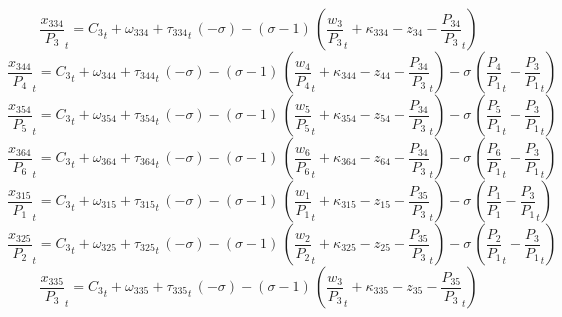 \begin{dmath}
{{\frac{x_{334}}{P_{3}}}}_{t}={{C_{3}}}_{t}+{{\omega_{334}}}+{{\tau_{334}}}_{t}\, \left(-{{\sigma}}\right)-\left({{\sigma}}-1\right)\, \left({{\frac{w_{3}}{P_{3}}}}_{t}+{{\kappa_{334}}}-{{z_{34}}}-{{\frac{P_{34}}{P_{3}}}}_{t}\right)
\end{dmath}
\begin{dmath}
{{\frac{x_{344}}{P_{4}}}}_{t}={{C_{3}}}_{t}+{{\omega_{344}}}+{{\tau_{344}}}_{t}\, \left(-{{\sigma}}\right)-\left({{\sigma}}-1\right)\, \left({{\frac{w_{4}}{P_{4}}}}_{t}+{{\kappa_{344}}}-{{z_{44}}}-{{\frac{P_{34}}{P_{3}}}}_{t}\right)-{{\sigma}}\, \left({{\frac{P_{4}}{P_{1}}}}_{t}-{{\frac{P_{3}}{P_{1}}}}_{t}\right)
\end{dmath}
\begin{dmath}
{{\frac{x_{354}}{P_{5}}}}_{t}={{C_{3}}}_{t}+{{\omega_{354}}}+{{\tau_{354}}}_{t}\, \left(-{{\sigma}}\right)-\left({{\sigma}}-1\right)\, \left({{\frac{w_{5}}{P_{5}}}}_{t}+{{\kappa_{354}}}-{{z_{54}}}-{{\frac{P_{34}}{P_{3}}}}_{t}\right)-{{\sigma}}\, \left({{\frac{P_{5}}{P_{1}}}}_{t}-{{\frac{P_{3}}{P_{1}}}}_{t}\right)
\end{dmath}
\begin{dmath}
{{\frac{x_{364}}{P_{6}}}}_{t}={{C_{3}}}_{t}+{{\omega_{364}}}+{{\tau_{364}}}_{t}\, \left(-{{\sigma}}\right)-\left({{\sigma}}-1\right)\, \left({{\frac{w_{6}}{P_{6}}}}_{t}+{{\kappa_{364}}}-{{z_{64}}}-{{\frac{P_{34}}{P_{3}}}}_{t}\right)-{{\sigma}}\, \left({{\frac{P_{6}}{P_{1}}}}_{t}-{{\frac{P_{3}}{P_{1}}}}_{t}\right)
\end{dmath}
\begin{dmath}
{{\frac{x_{315}}{P_{1}}}}_{t}={{C_{3}}}_{t}+{{\omega_{315}}}+{{\tau_{315}}}_{t}\, \left(-{{\sigma}}\right)-\left({{\sigma}}-1\right)\, \left({{\frac{w_{1}}{P_{1}}}}_{t}+{{\kappa_{315}}}-{{z_{15}}}-{{\frac{P_{35}}{P_{3}}}}_{t}\right)-{{\sigma}}\, \left({{\frac{P_{1}}{P_{1}}}}-{{\frac{P_{3}}{P_{1}}}}_{t}\right)
\end{dmath}
\begin{dmath}
{{\frac{x_{325}}{P_{2}}}}_{t}={{C_{3}}}_{t}+{{\omega_{325}}}+{{\tau_{325}}}_{t}\, \left(-{{\sigma}}\right)-\left({{\sigma}}-1\right)\, \left({{\frac{w_{2}}{P_{2}}}}_{t}+{{\kappa_{325}}}-{{z_{25}}}-{{\frac{P_{35}}{P_{3}}}}_{t}\right)-{{\sigma}}\, \left({{\frac{P_{2}}{P_{1}}}}_{t}-{{\frac{P_{3}}{P_{1}}}}_{t}\right)
\end{dmath}
\begin{dmath}
{{\frac{x_{335}}{P_{3}}}}_{t}={{C_{3}}}_{t}+{{\omega_{335}}}+{{\tau_{335}}}_{t}\, \left(-{{\sigma}}\right)-\left({{\sigma}}-1\right)\, \left({{\frac{w_{3}}{P_{3}}}}_{t}+{{\kappa_{335}}}-{{z_{35}}}-{{\frac{P_{35}}{P_{3}}}}_{t}\right)
\end{dmath}
